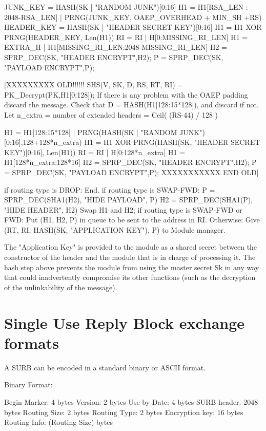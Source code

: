         JUNK_KEY = HASH(SK | "RANDOM JUNK")[0:16]
        H1 = H1[RSA_LEN : 2048-RSA_LEN] | 
             PRNG(JUNK_KEY, OAEP_OVERHEAD + MIN_SH +RS)
        HEADER_KEY = HASH(SK | "HEADER SECRET KEY")[0:16]
        H1 = H1 XOR PRNG(HEADER_KEY, Len(H1))
        RI = RI | H[0:MISSING_RI_LEN]
        H1 = EXTRA_H | H1[MISSING_RI_LEN:2048-MISSING_RI_LEN]
        H2 = SPRP_DEC(SK, "HEADER ENCRYPT",H2);
        P = SPRP_DEC(SK, "PAYLOAD ENCRYPT",P);

 [XXXXXXXXX OLD!!!!!!
        SHS(V, SK, D, RS, RT, RI) = PK_Decrypt(PK,H1[0:128]);
        If there is any problem with the OAEP padding discard the message.
        Check that D = HASH(H1[128:15*128]), and discard if not.
        Let n_extra = number of extended headers = Ceil( (RS-44) / 128 )
                  
        H1 = H1[128:15*128] | PRNG(HASH(SK | "RANDOM 
                                               JUNK")[0:16],128+128*n_extra)
        H1 = H1 XOR PRNG(HASH(SK, "HEADER SECRET KEY")[0:16], Len(H1))
        RI = RI | H[0:128*n_extra]
        H1 = H1[128*n_extra:128*16]
        H2 = SPRP_DEC(SK, "HEADER ENCRYPT",H2);
        P = SPRP_DEC(SK, "PAYLOAD ENCRYPT",P);
  XXXXXXXXXXX END OLD]

        if routing type is DROP:
                End.
        if routing type is SWAP-FWD:
                P = SPRP_DEC(SHA1(H2), "HIDE PAYLOAD", P)
                H2 = SPRP_DEC(SHA1(P), "HIDE HEADER", H2)
                Swap H1 and H2;
        if routing type is SWAP-FWD or FWD:
                Put (H1, H2, P) in queue to be sent to the address in RI.
        Otherwise:
                Give (RT, RI, HASH(SK, "APPLICATION KEY"), P) to
                Module manager.

The "Application Key" is provided to the module as a shared secret
between the constructor of the header and the module that is in charge
of processing it.  The hash step above prevents the module from using
the master secret Sk in any way that could inadvertently compromise
its other functions (such as the decryption of the unlinkability of
the message).

\section{Single Use Reply Block exchange formats}

A SURB can be encoded in a standard binary or ASCII format.

Binary Format:

   Begin Marker: 4 bytes
   Version:      2 bytes
   Use-by-Date:  4 bytes
   SURB header:  2048 bytes
   Routing Size: 2 bytes
   Routing Type: 2 bytes
   Encryption key: 16 bytes
   Routing Info: (Routing Size) bytes

